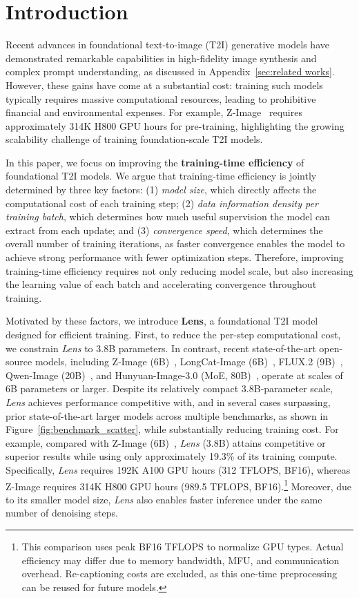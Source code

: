 
\section{Introduction}

Recent advances in foundational text-to-image (T2I) generative models have demonstrated remarkable capabilities in high-fidelity image synthesis and complex prompt understanding, as discussed in Appendix~\ref{sec:related works}. However, these gains have come at a substantial cost: training such models typically requires massive computational resources, leading to prohibitive financial and environmental expenses. For example, Z-Image~\citep{cai2025zimage} requires approximately 314K H800 GPU hours for pre-training, highlighting the growing scalability challenge of training foundation-scale T2I models.

In this paper, we focus on improving the \textbf{training-time efficiency} of foundational T2I models. We argue that training-time efficiency is jointly determined by three key factors: (1) \textit{model size}, which directly affects the computational cost of each training step; (2) \textit{data information density per training batch}, which determines how much useful supervision the model can extract from each update; and (3) \textit{convergence speed}, which determines the overall number of training iterations, as faster convergence enables the model to achieve strong performance with fewer optimization steps. Therefore, improving training-time efficiency requires not only reducing model scale, but also increasing the learning value of each batch and accelerating convergence throughout training.

Motivated by these factors, we introduce \textbf{Lens}, a foundational T2I model designed for efficient training. First, to reduce the per-step computational cost, we constrain \textit{Lens} to 3.8B parameters. In contrast, recent state-of-the-art open-source models, including Z-Image (6B)~\citep{cai2025zimage}, LongCat-Image (6B)~\citep{team2025longcat}, FLUX.2 (9B)~\citep{flux-2-2025}, Qwen-Image (20B)~\citep{wu2025qwenimage}, and Hunyuan-Image-3.0 (MoE, 80B)~\citep{cao2025hunyuanimage}, operate at scales of 6B parameters or larger. Despite its relatively compact 3.8B-parameter scale, \textit{Lens} achieves performance competitive with, and in several cases surpassing, prior state-of-the-art larger models across multiple benchmarks, as shown in Figure~\ref{fig:benchmark_scatter}, while substantially reducing training cost. For example, compared with Z-Image (6B)~\citep{cai2025zimage}, \textit{Lens} (3.8B) attains competitive or superior results while using only approximately 19.3\% of its training compute.
Specifically, \textit{Lens} requires 192K A100 GPU hours (312 TFLOPS, BF16), whereas Z-Image requires 314K H800 GPU hours (989.5 TFLOPS, BF16).\footnote{This comparison uses peak BF16 TFLOPS to normalize GPU types. Actual efficiency may differ due to memory bandwidth, MFU, and communication overhead. Re-captioning costs are excluded, as this one-time preprocessing can be reused for future models.} Moreover, due to its smaller model size, \textit{Lens} also enables faster inference under the same number of denoising steps.


